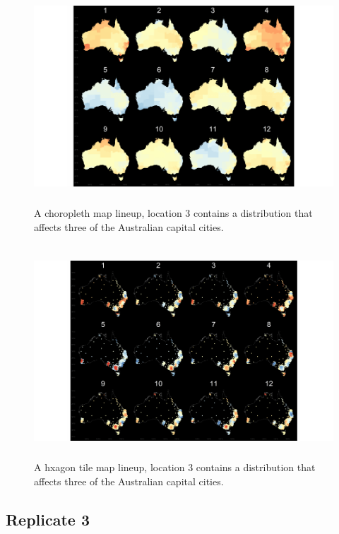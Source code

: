 \documentclass{monashthesis}
\begin{document}
\begin{figure}[H]
\centering
\includegraphics[height=8cm]{lineups/three-geo5-1.pdf}
\caption{\label{fig:three-geo5}A choropleth map lineup, location 3 contains a distribution that affects three of the Australian capital cities.}
\end{figure}

\begin{figure}[H]
\centering
\includegraphics[height=8cm]{lineups/three-hex5-1.pdf}
\caption{\label{fig:three-hex5}A hxagon tile map lineup, location 3 contains a distribution that affects three of the Australian capital cities.}
\end{figure}

\hypertarget{replicate-3-1}{%
\subsection{Replicate 3}\label{replicate-3-1}}
\end{document}
